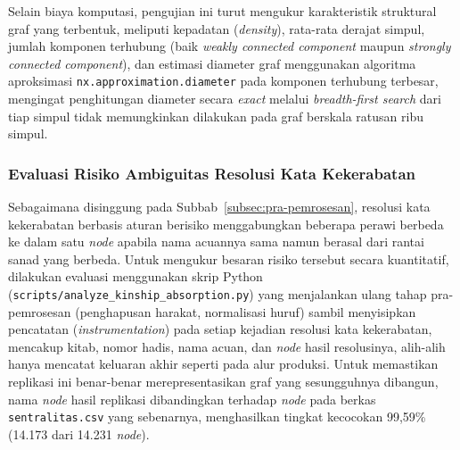 Selain biaya komputasi, pengujian ini turut mengukur karakteristik struktural graf yang terbentuk, meliputi kepadatan (\textit{density}), rata-rata derajat simpul, jumlah komponen terhubung (baik \textit{weakly connected component} maupun \textit{strongly connected component}), dan estimasi diameter graf menggunakan algoritma aproksimasi \texttt{nx.approximation.}\allowbreak\texttt{diameter} pada komponen terhubung terbesar, mengingat penghitungan diameter secara \textit{exact} melalui \textit{breadth-first search} dari tiap simpul tidak memungkinkan dilakukan pada graf berskala ratusan ribu simpul.

\subsubsection{Evaluasi Risiko Ambiguitas Resolusi Kata Kekerabatan}
\label{subsubsec:evaluasi-kekerabatan}
\begin{sloppypar}
Sebagaimana disinggung pada Subbab~\ref{subsec:pra-pemrosesan}, resolusi kata kekerabatan berbasis aturan berisiko menggabungkan beberapa perawi berbeda ke dalam satu \textit{node} apabila nama acuannya sama namun berasal dari rantai sanad yang berbeda. Untuk mengukur besaran risiko tersebut secara kuantitatif, dilakukan evaluasi menggunakan skrip Python (\texttt{scripts/analyze\_}\allowbreak\texttt{kinship\_absorption.py}) yang menjalankan ulang tahap pra-pemrosesan (penghapusan harakat, normalisasi huruf) sambil menyisipkan pencatatan (\textit{instrumentation}) pada setiap kejadian resolusi kata kekerabatan, mencakup kitab, nomor hadis, nama acuan, dan \textit{node} hasil resolusinya, alih-alih hanya mencatat keluaran akhir seperti pada alur produksi. Untuk memastikan replikasi ini benar-benar merepresentasikan graf yang sesungguhnya dibangun, nama \textit{node} hasil replikasi dibandingkan terhadap \textit{node} pada berkas \texttt{sentralitas.csv} yang sebenarnya, menghasilkan tingkat kecocokan 99,59\% (14.173 dari 14.231 \textit{node}).
\end{sloppypar}

